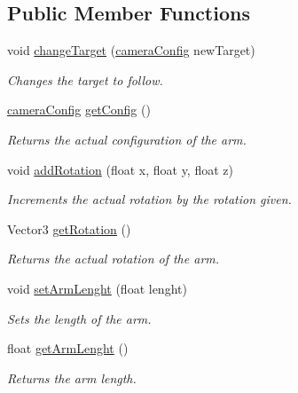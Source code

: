 \subsection*{Public Member Functions}
\begin{DoxyCompactItemize}
\item 
void \mbox{\hyperlink{class_spring_arm_a04b2467d564ee5c84f5c899397ef6a7f}{change\+Target}} (\mbox{\hyperlink{structcamera_config}{camera\+Config}} new\+Target)
\begin{DoxyCompactList}\small\item\em Changes the target to follow. \end{DoxyCompactList}\item 
\mbox{\hyperlink{structcamera_config}{camera\+Config}} \mbox{\hyperlink{class_spring_arm_a42c1c7151c8691997160b4aa6fb7dc62}{get\+Config}} ()
\begin{DoxyCompactList}\small\item\em Returns the actual configuration of the arm. \end{DoxyCompactList}\item 
void \mbox{\hyperlink{class_spring_arm_a316922f360fb101c0a219720771b6d88}{add\+Rotation}} (float x, float y, float z)
\begin{DoxyCompactList}\small\item\em Increments the actual rotation by the rotation given. \end{DoxyCompactList}\item 
Vector3 \mbox{\hyperlink{class_spring_arm_ae6f57a311c474a058fce74a4450db6bf}{get\+Rotation}} ()
\begin{DoxyCompactList}\small\item\em Returns the actual rotation of the arm. \end{DoxyCompactList}\item 
void \mbox{\hyperlink{class_spring_arm_acce988449ddf120825cc02b1dce3fb1c}{set\+Arm\+Lenght}} (float lenght)
\begin{DoxyCompactList}\small\item\em Sets the length of the arm. \end{DoxyCompactList}\item 
float \mbox{\hyperlink{class_spring_arm_a92257d8d0f3e1e339569a22eea574784}{get\+Arm\+Lenght}} ()
\begin{DoxyCompactList}\small\item\em Returns the arm length. \end{DoxyCompactList}\item 

\end{DoxyCompactItemize}

